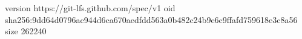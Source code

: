 version https://git-lfs.github.com/spec/v1
oid sha256:9dd64d0796ac944d6ca670aedfdd563a0b482c24b9e6c9ffafd759618e3c8a56
size 262240

